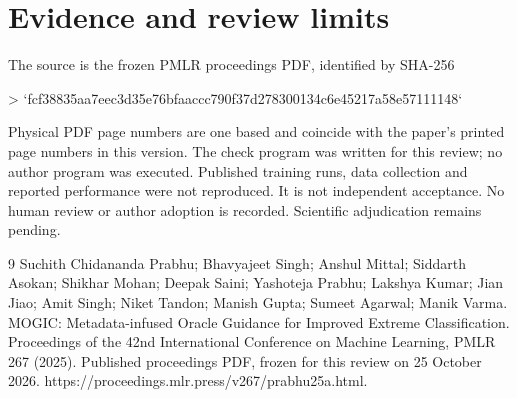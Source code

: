 \documentclass[10pt]{article}
\begin{document}
\section*{Evidence and review limits}
The source is the frozen PMLR proceedings PDF, identified by SHA-256\par
> `fcf38835aa7eec3d35e76bfaaccc790f37d278300134c6e45217a58e57111148`\par
Physical PDF page numbers are one based and coincide with the paper’s printed page numbers in this version. The check program was written for this review; no author program was executed. Published training runs, data collection and reported performance were not reproduced. It is not independent acceptance. No human review or author adoption is recorded. Scientific adjudication remains pending.\par
9 Suchith Chidananda Prabhu; Bhavyajeet Singh; Anshul Mittal; Siddarth Asokan; Shikhar Mohan; Deepak Saini; Yashoteja Prabhu; Lakshya Kumar; Jian Jiao; Amit Singh; Niket Tandon; Manish Gupta; Sumeet Agarwal; Manik Varma. MOGIC: Metadata-infused Oracle Guidance for Improved Extreme Classification. Proceedings of the 42nd International Conference on Machine Learning, PMLR 267 (2025). Published proceedings PDF, frozen for this review on 25 October 2026. https://proceedings.mlr.press/v267/prabhu25a.html.\par
\end{document}
